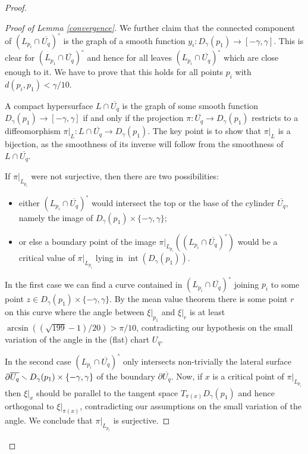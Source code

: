 \documentclass[10pt]{amsart}
\let\moins\smallsetminus
\DeclareMathOperator{\inte}{int}
\theoremstyle{definition}
\theoremstyle{remark}
\numberwithin{equation}{section}
\begin{document}
\begin{proof}
\begin{proof}[Proof of Lemma \ref{convergence}]
We further claim that the connected component of $(L_{p_i}\cap \overline{U_q})^{\circ}$ is
the graph of a smooth function $y_i:D_{\gamma}(p_1)\to [-\gamma,\gamma]$.
This is clear for $(L_{p_1}\cap \overline{U_q})^{\circ}$ and hence for all leaves $(L_{p_i}\cap \overline{U_q})^{\circ}$
which are close enough to it. We have to prove that this holds for
all points $p_i$ with $d(p_i,p_1) <\gamma/10$.

A compact hypersurface $L\cap\overline{U_q}$ is the graph of some smooth function
$D_{\gamma}(p_1)\to [-\gamma,\gamma]$ if and only if the
projection $\pi:\overline{U_q}\to D_{\gamma}(p_1)$ restricts to a diffeomorphism
$\pi|_{L}:L \cap \overline{U_q}\to D_{\gamma}(p_1)$.
The key point is to show that $\pi|_{L}$ is a bijection, as the smoothness of its inverse will follow
from the smoothness of $L\cap\overline{U_q}$.

If $\pi|_{L_{p_i}}$ were not surjective, then there are two possibilities:
\begin{itemize}
\item
either $(L_{p_i}\cap \overline{U_q})^{\circ}$ would intersect the top or the base of the cylinder $\overline{U_q}$, namely the
image of $D_{\gamma}(p_1)\times\{-\gamma,\gamma\}$;
\item
or else a boundary point of the image $\pi|_{L_{p_i}}((L_{p_i}\cap \overline{U_q})^{\circ})$ would be a
critical value of $\pi|_{L_{p_i}}$ lying in $\inte (D_{\gamma}(p_1))$.
\end{itemize}

In the first case we can find a curve contained in $(L_{p_i}\cap \overline{U_q})^{\circ}$ joining $p_i$ to some point $z\in D_{\gamma}(p_1)\times\{-\gamma,\gamma\}$. By the mean value theorem there is some point $r$ on this curve where the angle between $\xi|_{p_1}$ and $\xi|_r$ is at least $\arcsin\left((\sqrt{199}-1)/20\right)> \pi/10$, contradicting our hypothesis on the small variation of the angle in the (flat) chart $U_q$.

In the second case $(L_{p_i}\cap \overline{U_q})^{\circ}$ only intersects non-trivially the lateral surface
$\partial \overline{U_q}\moins\nobreak D_{\gamma}(p_1)\times\{-\gamma,\gamma\}$ of the boundary
$\partial \overline{U_q}$.
Now, if $x$ is a critical point of $\pi|_{L_{p_i}}$ then $\xi|_x$ should be parallel to the tangent space
$T_{\pi(x)}D_{\gamma}(p_1)$ and hence orthogonal to $\xi|_{\pi(x)}$, contradicting our assumptions on
the small variation of the angle.
We conclude that $\pi|_{L_{p_i}}$ is surjective.


\end{proof}
\end{proof}
\end{document}
